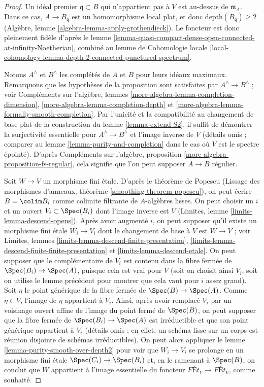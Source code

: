 \begin{proof}
Un idéal premier $\mathfrak q \subset B$ qui n'appartient pas à $V$
est au-dessus de $\mathfrak m_A$. Dans ce cas, $A \to B_\mathfrak q$
est un homomorphisme local plat, et donc $\text{depth}(B_\mathfrak q) \geq 2$
(Algèbre, lemme \ref{algebra-lemma-apply-grothendieck}).
Le foncteur est donc pleinement fidèle d'après le
lemme \ref{lemma-quasi-compact-dense-open-connected-at-infinity-Noetherian},
combiné au lemme de Cohomologie locale
\ref{local-cohomology-lemma-depth-2-connected-punctured-spectrum}.

\medskip\noindent
Notons $A^\wedge$ et $B^\wedge$ les complétés de $A$ et $B$
pour leurs idéaux maximaux. Remarquons que les hypothèses
de la proposition sont satisfaites par $A^\wedge \to B^\wedge$ ; voir
Compléments sur l'algèbre, lemmes
\ref{more-algebra-lemma-completion-dimension},
\ref{more-algebra-lemma-completion-depth} et
\ref{more-algebra-lemma-formally-smooth-completion}.
Par l'unicité et la compatibilité au changement de base plat
de la construction du lemme \ref{lemma-extend-S2},
il suffit de démontrer la surjectivité essentielle pour
$A^\wedge \to B^\wedge$ et l'image inverse de $V$
(détails omis ; comparer au lemme \ref{lemma-purity-and-completion}
dans le cas où $V$ est le spectre épointé).
D'après Compléments sur l'algèbre, proposition \ref{more-algebra-proposition-fs-regular},
cela signifie que l'on peut supposer $A \to B$ régulier.

\medskip\noindent
Soit $W \to V$ un morphisme fini étale.
D'après le théorème de Popescu
(Lissage des morphismes d'anneaux, théorème \ref{smoothing-theorem-popescu}),
on peut écrire $B = \colim B_i$ comme colimite filtrante
de $A$-algèbres lisses. On peut choisir un $i$ et un
ouvert $V_i \subset \Spec(B_i)$ dont l'image inverse est $V$
(Limites, lemme \ref{limits-lemma-descend-opens}).
Après avoir augmenté $i$, on peut supposer qu'il existe un morphisme
fini étale $W_i \to V_i$ dont le changement de base à $V$
est $W \to V$ ; voir
Limites, lemmes \ref{limits-lemma-descend-finite-presentation},
\ref{limits-lemma-descend-finite-finite-presentation} et
\ref{limits-lemma-descend-etale}.
On peut supposer que le complémentaire de $V_i$ est contenu
dans la fibre fermée de $\Spec(B_i) \to \Spec(A)$, puisque cela
est vrai pour $V$ (soit on choisit ainsi $V_i$, soit on utilise
le lemme précédent pour montrer que cela vaut pour $i$ assez grand).
Soit $\eta$ le point générique de la fibre fermée
de $\Spec(B) \to \Spec(A)$. Comme $\eta \in V$, l'image de
$\eta$ appartient à $V_i$. Ainsi, après avoir remplacé $V_i$ par un
voisinage ouvert affine de l'image du point fermé
de $\Spec(B)$, on peut supposer que la fibre fermée
de $\Spec(B_i) \to \Spec(A)$ est irréductible et que
son point générique appartient à $V_i$ (détails omis ; en effet,
un schéma lisse sur un corps est réunion disjointe de schémas irréductibles).
On peut alors appliquer le lemme \ref{lemma-purity-smooth-over-depth2}
pour voir que $W_i \to V_i$ se prolonge en un morphisme fini étale
$\Spec(C_i) \to \Spec(B_i)$ et, en le ramenant
à $\Spec(B)$, on conclut que $W$ appartient à
l'image essentielle du foncteur
$\textit{F\'Et}_Y \to \textit{F\'Et}_V$,
comme souhaité.
\end{proof}
